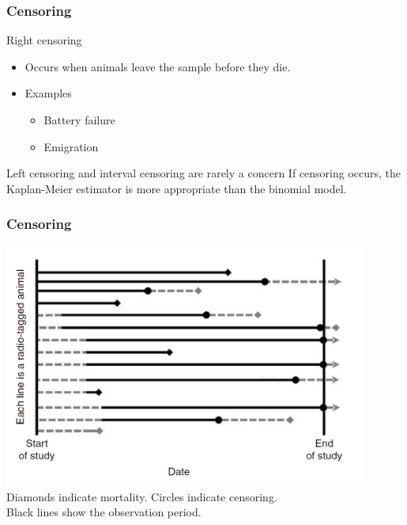 \documentclass[color=usenames,dvipsnames]{beamer}\usepackage[]{graphicx}\usepackage[]{color}
\begin{document}
\begin{frame}
  \frametitle{Censoring}
  {\large %
    Right censoring} 
  \begin{itemize}
    \normalsize
    \item Occurs when animals leave the sample before they die.
    \item Examples
    \begin{itemize}
      \item Battery failure
      \item Emigration
    \end{itemize}
  \end{itemize}
  \pause
  \vfill
  {\large %
    Left censoring and interval censoring are rarely a concern}
  \pause
  \vfill
  {\centering If censoring occurs, 
    the Kaplan-Meier estimator is more appropriate than the binomial model. \\}
\end{frame}



\begin{frame}
  \frametitle{Censoring}
  \centering
  \includegraphics[width=0.9\textwidth]{figs/censoring} \\
  Diamonds indicate mortality. Circles indicate censoring. \\
  Black lines show the observation period. \\ %
\end{frame}
\end{document}
